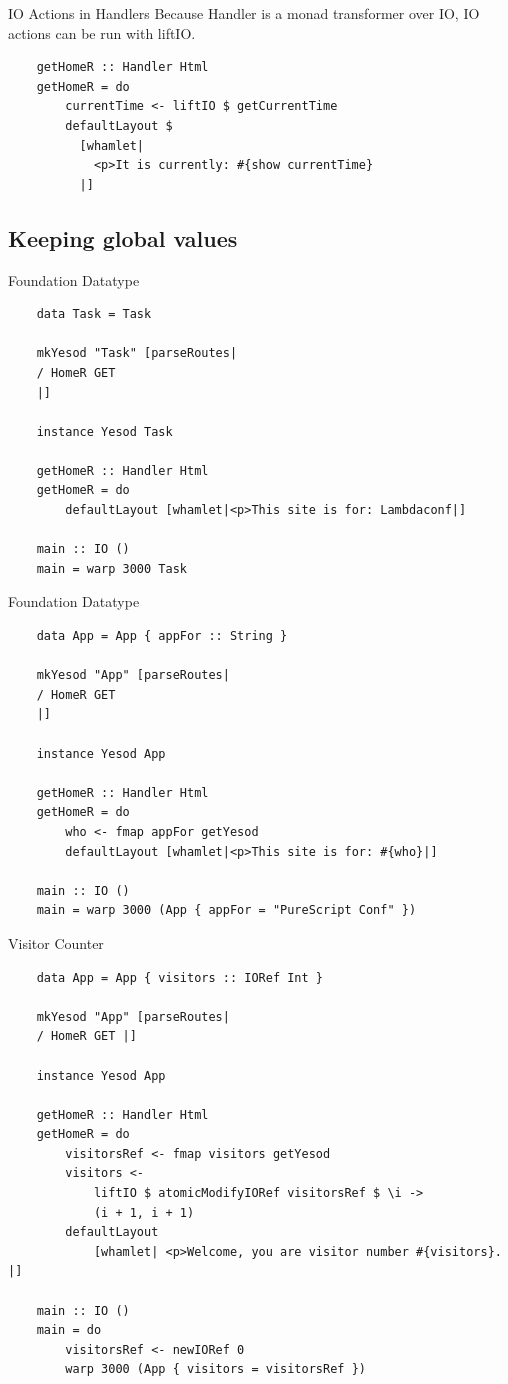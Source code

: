 \documentclass[pdf]{beamer}
\begin{document}
\begin{frame}[fragile]{IO Actions in Handlers}
  Because Handler is a monad transformer over IO, IO actions can be
  run with liftIO.
  \begin{verbatim}
    getHomeR :: Handler Html
    getHomeR = do
        currentTime <- liftIO $ getCurrentTime
        defaultLayout $
          [whamlet|
            <p>It is currently: #{show currentTime}
          |]
  \end{verbatim}
\end{frame}

\subsection{Keeping global values}
\begin{frame}[fragile]{Foundation Datatype}
  \begin{verbatim}
    data Task = Task

    mkYesod "Task" [parseRoutes|
    / HomeR GET
    |]

    instance Yesod Task

    getHomeR :: Handler Html
    getHomeR = do
        defaultLayout [whamlet|<p>This site is for: Lambdaconf|]

    main :: IO ()
    main = warp 3000 Task
  \end{verbatim}
\end{frame}

\begin{frame}[fragile]{Foundation Datatype}
  \begin{verbatim}
    data App = App { appFor :: String }

    mkYesod "App" [parseRoutes|
    / HomeR GET
    |]

    instance Yesod App

    getHomeR :: Handler Html
    getHomeR = do
        who <- fmap appFor getYesod
        defaultLayout [whamlet|<p>This site is for: #{who}|]

    main :: IO ()
    main = warp 3000 (App { appFor = "PureScript Conf" })
  \end{verbatim}
\end{frame}

\begin{frame}[fragile]{Visitor Counter}
  \begin{verbatim}
    data App = App { visitors :: IORef Int }

    mkYesod "App" [parseRoutes|
    / HomeR GET |]

    instance Yesod App

    getHomeR :: Handler Html
    getHomeR = do
        visitorsRef <- fmap visitors getYesod
        visitors <-
            liftIO $ atomicModifyIORef visitorsRef $ \i ->
            (i + 1, i + 1)
        defaultLayout
            [whamlet| <p>Welcome, you are visitor number #{visitors}. |]

    main :: IO ()
    main = do
        visitorsRef <- newIORef 0
        warp 3000 (App { visitors = visitorsRef })
  \end{verbatim}
\end{frame}
\end{document}
